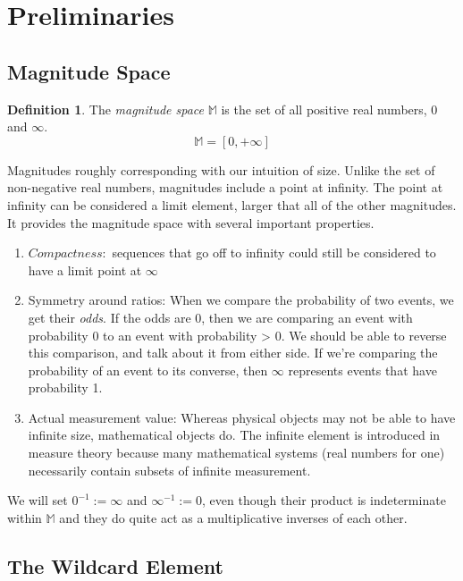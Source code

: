 \documentclass[twoside]{article}
\theoremstyle{plain}%
\theoremstyle{definition}
\newtheorem{definition}{Definition}[section]
\theoremstyle{remark}
\begin{document}
\section{Preliminaries}
\subsection{Magnitude Space}

\begin{definition}
The \textit{magnitude space} \(\mathbb{M}\) is the set of all positive real numbers, \(0\) and \(\infty\).
\[\mathbb{M} = [0, +\infty]\]
\end{definition}

Magnitudes roughly corresponding with our intuition of size. Unlike the set of non-negative real numbers, magnitudes include a point at infinity. The point at infinity can be considered a limit element, larger that all of the other magnitudes. It provides the magnitude space with several important properties.

\begin{enumerate}
\item \(Compactness:\) sequences that go off to infinity could still be considered to have a limit point at \(\infty\)
\item Symmetry around ratios: When we compare the probability of two events, we get their \textit{odds}. If the odds are 0, then we are comparing an event with probability 0 to an event with probability > 0. We should be able to reverse this comparison, and talk about it from either side. If we're comparing the probability of an event to its converse, then \(\infty\) represents events that have probability 1.
\item Actual measurement value: Whereas physical objects may not be able to have infinite size, mathematical objects do. The infinite element is introduced in measure theory because many mathematical systems (real numbers for one) necessarily contain subsets of infinite measurement.
\end{enumerate}

We will set \(0^{-1} := \infty\) and \(\infty^{-1} := 0\), even though their product is indeterminate within \(\mathbb{M}\) and they do quite act as a multiplicative inverses of each other.

\subsection{The Wildcard Element}
\end{document}
